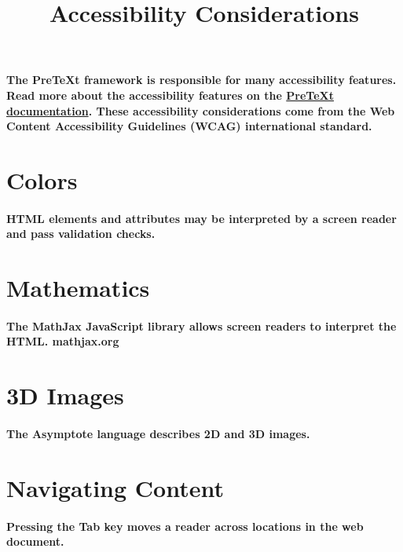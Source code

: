 \documentclass{article}
\title{Accessibility Considerations}
\begin{document}
\maketitle
\paragraph{
The PreTeXt framework is responsible for many accessibility features. Read more about the accessibility features on the \href{https://pretextbook.org/doc/guide/html/topic-accessibility.html}{PreTeXt documentation}. These accessibility considerations come from the Web Content Accessibility Guidelines (WCAG) international standard.
}

\section{Colors}
\paragraph{
HTML elements and attributes may be interpreted by a screen reader and pass validation checks.
}

\section{Mathematics}
\paragraph{
The MathJax JavaScript library allows screen readers to interpret the HTML.
mathjax.org
}

\section{3D Images}
\paragraph{
The Asymptote language describes 2D and 3D images.
}

\section{Navigating Content}
\paragraph{
Pressing the Tab key moves a reader across locations in the web document.
}
\end{document}
